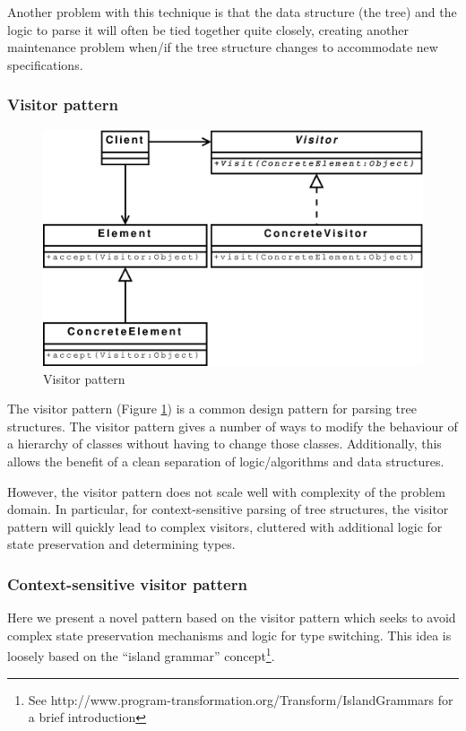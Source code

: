 Another problem with this technique is that the data structure (the tree) and
the logic to parse it will often be tied together quite closely, creating
another maintenance problem when/if the tree structure changes to
accommodate new specifications.

\subsubsection{Visitor pattern}
\label{sect:theory:visitorPattern}

\begin{figure}[h]
  \centering
    \includegraphics[scale=0.40]{diagrams/visitor_pattern} 
  \caption{Visitor pattern}
  \label{figure:parser:visitor_pattern}
\end{figure}

The visitor pattern\cite{agile_software} (Figure \ref{figure:parser:visitor_pattern}) is a common design pattern for parsing
tree structures. The visitor pattern gives a number of ways to modify the
behaviour of a hierarchy of classes without having to change those classes.
Additionally, this allows the benefit of a clean separation of logic/algorithms
and data structures.

However, the visitor pattern does not scale well with complexity of the problem
domain. In particular, for context-sensitive parsing of tree structures, the
visitor pattern will quickly lead to complex visitors, cluttered with
additional logic for state preservation and determining types.  

\subsubsection{Context-sensitive visitor pattern}
\label{sect:theory:contextVisitorPattern}
Here we present a novel pattern based on the visitor pattern which seeks to
avoid complex state preservation mechanisms and logic for type switching. This idea
is loosely based on the ``island grammar'' concept\cite{islandGrammar}\footnote{See
http://www.program-transformation.org/Transform/IslandGrammars for a brief
introduction}.

